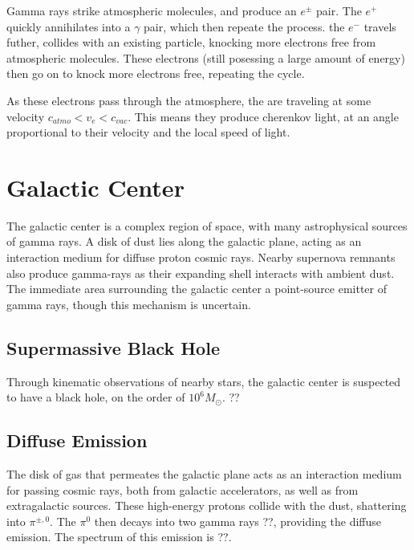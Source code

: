 Gamma rays strike atmospheric molecules, and produce an $e^\pm$ pair.
The $e^+$ quickly annihilates into a $\gamma$ pair, which then repeate the process.
the $e^-$ travels futher, collides with an existing particle, knocking more electrons free from atmospheric molecules.
These electrons (still posessing a large amount of energy) then go on to knock more electrons free, repeating the cycle.

As these electrons pass through the atmosphere, the are traveling at some velocity $c_{atmo}<v_e<c_{vac}$.
This means they produce cherenkov light, at an angle proportional to their velocity and the local speed of light.


\section{Galactic Center}

The galactic center is a complex region of space, with many astrophysical sources of gamma rays.
A disk of dust lies along the galactic plane, acting as an interaction medium for diffuse proton cosmic rays.
Nearby supernova remnants also produce gamma-rays as their expanding shell interacts with ambient dust.
The immediate area surrounding the galactic center a point-source emitter of gamma rays, though this mechanism is uncertain.

\subsection{Supermassive Black Hole}

Through kinematic observations of nearby stars, the galactic center is suspected to have a black hole, on the order of $10^6 M_{\odot}$. ??

\subsection{Diffuse Emission}
The disk of gas that permeates the galactic plane acts as an interaction medium for passing cosmic rays, both from galactic accelerators, as well as from extragalactic sources.
These high-energy protons collide with the dust, shattering into $\pi^{\pm,0}$.
The $\pi^0$ then decays into two gamma rays ??, providing the diffuse emission.
The spectrum of this emission is ??.


